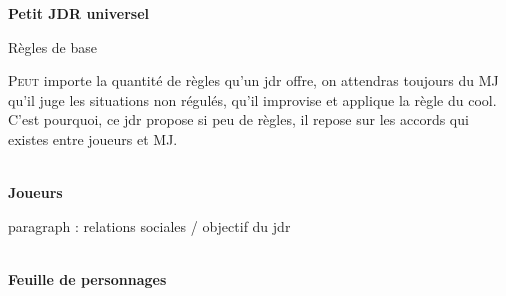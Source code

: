 \documentclass[11pt]{article} %
\newcommand{\enluminure}[2]{\lettrine[lines=3]{\small \initfamily #1}{#2}}
\newcommand{\myjump}[1][1]{\mbox{}\\[#1cm]}
\begin{document}
\pagestyle{empty}

\begin{center}
    \textbf{Petit JDR universel}

    Règles de base
\end{center}

\enluminure{P}{eut} importe la quantité de règles qu'un jdr offre, on attendras toujours du MJ qu'il juge les situations non régulés, qu'il improvise et applique la règle du cool. C'est pourquoi, ce jdr propose si peu de règles, il repose sur les accords qui existes entre joueurs et MJ.


\myjump[0]
\textbf{\huge Joueurs}

\begin{center}
paragraph : relations sociales / objectif du jdr
\end{center}



\myjump[0]
\textbf{Feuille de personnages}
\end{document}
